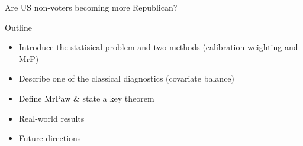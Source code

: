 \begin{frame}{Are US non-voters becoming more Republican?}

\end{frame}




\begin{frame}{Outline}
%
\begin{itemize}
    \item Introduce the statisical problem and two methods (calibration weighting and MrP)
    \item Describe one of the classical diagnostics (covariate balance)
    \item Define MrPaw \& state a key theorem
    \item Real-world results
    \item Future directions
\end{itemize}
%
\end{frame}
